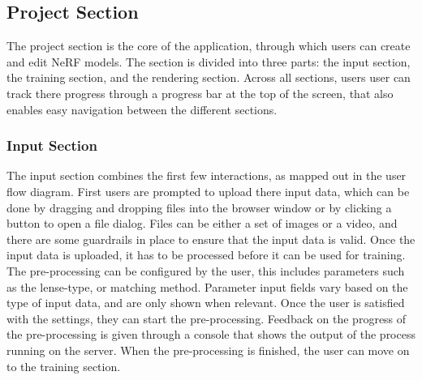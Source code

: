 \subsection*{Project Section}

The project section is the core of the application, through which users can create and edit NeRF models.
The section is divided into three parts: the input section, the training section, and the rendering section.
Across all sections, users user can track there progress through a progress bar at the top of the screen, that also enables easy navigation between the different sections.

\subsubsection{Input Section}

The input section combines the first few interactions, as mapped out in the user flow diagram.
First users are prompted to upload there input data, which can be done by dragging and dropping files into the browser window or by clicking a button to open a file dialog.
Files can be either a set of images or a video, and there are some guardrails in place to ensure that the input data is valid.
Once the input data is uploaded, it has to be processed before it can be used for training. 
The pre-processing can be configured by the user, this includes parameters such as the lense-type, or matching method.
Parameter input fields vary based on the type of input data, and are only shown when relevant.
Once the user is satisfied with the settings, they can start the pre-processing.
Feedback on the progress of the pre-processing is given through a console that shows the output of the process running on the server.
When the pre-processing is finished, the user can move on to the training section. 

